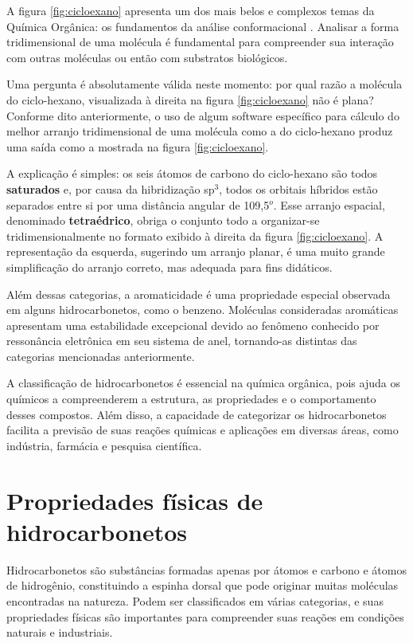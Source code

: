 \documentclass[a4paper,12pt]{book}
\begin{document}
A figura \ref{fig:cicloexano} apresenta um dos mais belos e complexos temas da Química Orgânica: os fundamentos da análise conformacional \cite{carey2022organic}. Analisar a forma tridimensional de uma molécula é fundamental para compreender sua interação com outras moléculas ou então com substratos biológicos. 

Uma pergunta é absolutamente válida neste momento: por qual razão a molécula do ciclo-hexano, visualizada à direita na figura \ref{fig:cicloexano} não é plana? Conforme dito anteriormente, o uso de algum software específico para cálculo do melhor arranjo tridimensional de uma molécula como a do ciclo-hexano produz uma saída como a mostrada na figura \ref{fig:cicloexano}.

A explicação é simples: os seis átomos  de carbono do ciclo-hexano são todos \textbf{saturados} e, por causa da hibridização sp$^3$, todos os orbitais híbridos estão separados entre si por uma distância angular de 109,5$^o$. Esse arranjo espacial, denominado \textbf{tetraédrico}, obriga o conjunto todo a organizar-se tridimensionalmente no formato exibido à direita da figura \ref{fig:cicloexano}. A representação da esquerda, sugerindo um arranjo planar, é uma muito grande simplificação do arranjo correto, mas adequada para fins didáticos.

Além dessas categorias, a aromaticidade é uma propriedade especial observada em alguns hidrocarbonetos, como o benzeno. Moléculas consideradas aromáticas apresentam uma estabilidade excepcional devido ao fenômeno conhecido por ressonância eletrônica em seu sistema de anel, tornando-as distintas das categorias mencionadas anteriormente.

A classificação de hidrocarbonetos é essencial na química orgânica, pois ajuda os químicos a compreenderem a estrutura, as propriedades e o comportamento desses compostos. Além disso, a capacidade de categorizar os hidrocarbonetos facilita a previsão de suas reações químicas e aplicações em diversas áreas, como indústria, farmácia e pesquisa científica. 

\section{Propriedades físicas de hidrocarbonetos}
Hidrocarbonetos são substâncias formadas apenas por átomos e carbono e átomos de hidrogênio, constituindo a espinha dorsal que pode originar muitas moléculas encontradas na natureza. Podem ser classificados em várias categorias, e suas propriedades físicas são importantes para compreender suas reações em condições naturais e industriais.
\end{document}
